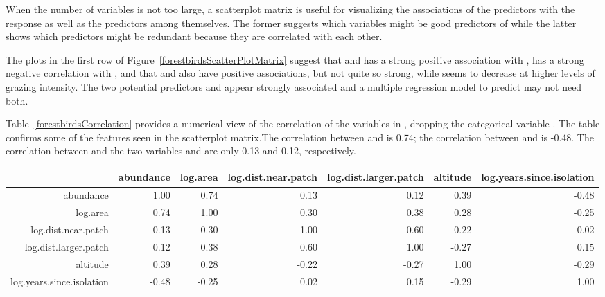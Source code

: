 When the number of variables is not too large, a scatterplot matrix is useful for visualizing the associations of the predictors with the response as well as the predictors among themselves.  The former suggests which variables might be good predictors of  while the latter shows which predictors might be redundant because they are correlated with each other.

The plots in the first row of Figure~\ref{forestbirdsScatterPlotMatrix} suggest that  and has a strong positive association with ,  has a strong negative correlation with , and that  and  also have positive associations, but not quite so strong, while  seems to decrease at higher levels of grazing intensity.  The two potential predictors  and  appear strongly associated and a multiple regression model to predict  may not need both.  

Table~\ref{forestbirdsCorrelation} provides a numerical view of the correlation of the variables in , dropping the categorical variable .  The table confirms some of the features seen in the scatterplot matrix.The correlation between  and  is 0.74; the correlation between  and  is -0.48. The correlation between  and the two variables  and  are only 0.13 and 0.12, respectively.


\small

\begin{table}[ht]
\centering
\begin{tabular}{rrrrrrr}
  \hline
 & abundance & log.area & log.dist.near.patch & log.dist.larger.patch & altitude & log.years.since.isolation \\ 
  \hline
abundance & 1.00 & 0.74 & 0.13 & 0.12 & 0.39 & -0.48 \\ 
  log.area & 0.74 & 1.00 & 0.30 & 0.38 & 0.28 & -0.25 \\ 
  log.dist.near.patch & 0.13 & 0.30 & 1.00 & 0.60 & -0.22 & 0.02 \\ 
  log.dist.larger.patch & 0.12 & 0.38 & 0.60 & 1.00 & -0.27 & 0.15 \\ 
  altitude & 0.39 & 0.28 & -0.22 & -0.27 & 1.00 & -0.29 \\ 
  log.years.since.isolation & -0.48 & -0.25 & 0.02 & 0.15 & -0.29 & 1.00 \\ 
   \hline
\end{tabular}
\end{table}

